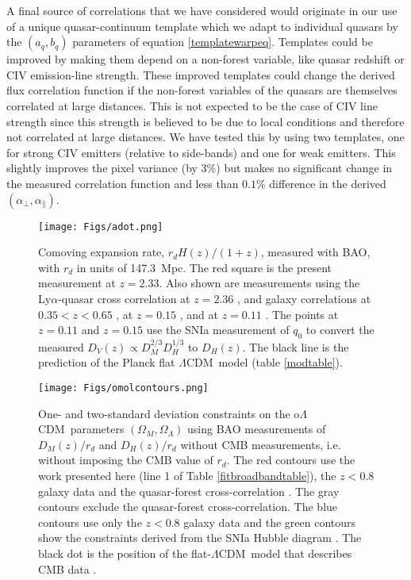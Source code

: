 \documentclass{aa}
\newcommand{\apar}{\alpha_\parallel}
\newcommand{\aperp}{\alpha_\perp}
\newcommand{\lya}{Ly$\alpha$}
\newcommand{\om}{\Omega_M}
\newcommand{\ol}{\Omega_\Lambda}
\newcommand{\DM}{D_M}
\newcommand{\DHub}{D_H}
\newcommand{\DV}{D_V}
\newcommand{\lcdm}{$\Lambda$CDM~}
\begin{document}
A final source of correlations that we have considered would originate
in our use of a unique quasar-continuum template which we adapt
to individual quasars by the $(a_q,b_q)$ parameters of
equation \ref{templatewarpeq}.
Templates could be improved by making them depend on
a non-forest variable, like
quasar redshift or CIV emission-line strength.
These improved templates could change the derived flux correlation
function if the non-forest variables of the quasars are themselves
correlated  at large distances.
This is not expected to be the case of CIV line strength since
this strength is believed to be due to local conditions and
therefore not correlated at large distances.
We have tested this by using two templates, one for strong CIV
emitters (relative to side-bands) and one for weak emitters.
This slightly improves the pixel variance (by 3\%) but
makes no significant change in the measured correlation
function and less than $0.1\%$ difference in the  derived $(\aperp,\apar)$.  




\begin{figure}[t] 
\texttt{[image: Figs/adot.png]}
\caption{Comoving expansion
  rate, $r_dH(z)/(1+z)$, measured with BAO, with $r_d$ in units
of 147.3~Mpc.
The red square is the present measurement at $z=2.33$.
Also shown are measurements using
the \lya-quasar cross correlation at
$z=2.36$ \citep{2014JCAP...05..027F},
and  galaxy correlations at
$0.35<z<0.65$ \citep{2016arXiv160703155A},
at $z=0.15$ \citep{2015MNRAS.449..835R}, and
at $z=0.11$ \citep{2011MNRAS.416.3017B}. 
The points at $z=0.11$  
and $z=0.15$ use
the SNIa measurement of $q_0$ \citep{2014A&A...568A..22B}
to convert the measured $\DV(z)\propto \DM^{2/3}\DHub^{1/3}$ to $D_H(z)$.
The black line is the prediction of the Planck flat \lcdm model
(table \ref{modtable}).
}
\label{adotfig}
\end{figure}

\begin{figure}[tb]
\texttt{[image: Figs/omolcontours.png]}
\caption{One- and two-standard deviation
  constraints on the o\lcdm parameters
  $(\om,\ol)$ using BAO measurements of
  $\DM(z)/r_d$ and $\DHub(z)/r_d$ without CMB measurements, i.e.
  without imposing the CMB value of $r_d$.
  The red contours use
  the work presented here
  (line 1 of Table \ref{fitbroadbandtable}),
  the $z<0.8$ galaxy
  data \citep{2016arXiv160703155A,2011MNRAS.416.3017B,2015MNRAS.449..835R}
  and the quasar-forest cross-correlation \citep{2014JCAP...05..027F}.
  The gray contours exclude the quasar-forest cross-correlation.
  The blue contours use only the $z<0.8$ galaxy data and the 
  green contours show the constraints derived from the SNIa
  Hubble diagram \citep{2014A&A...568A..22B}.
  The black dot is the position of the flat-\lcdm model that
  describes CMB data \citep{2016A&A...594A..13P}.
}
\label{omolfig}
\end{figure}
\end{document}
